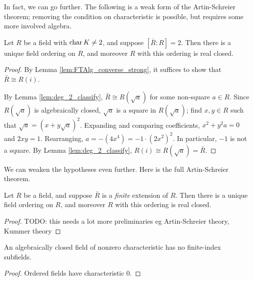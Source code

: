 In fact, we can go further. The following is a weak form of the Artin-Schreier theorem; removing the condition on characteristic is possible, but requires some more involved algebra.

\begin{theorem}
  \label{thm:Artin-Schreier_weak}
  Let $R$ be a field with $\operatorname{char} K\neq2$, and suppose $[\bar{R}:R]=2$. Then there is a unique field ordering on $R$, and moreover $R$ with this ordering is real closed.
\end{theorem}
\begin{proof}
  By Lemma \ref{lem:FTAlg_converse_strong}, it suffices to show that $\bar{R}\cong R(i)$.

  By Lemma \ref{lem:deg_2_classify}, $\bar{R}\cong R(\sqrt{a})$ for some non-square $a\in R$. Since $R(\sqrt{a})$ is algebraically closed, $\sqrt{a}$ is a square in $R(\sqrt{a})$; find $x,y\in R$ such that $\sqrt{a}=(x+y\sqrt{a})^2$. Expanding and comparing coefficients, $x^2+y^2a=0$ and $2xy=1$. Rearranging, $a=-(4x^4)=-1\cdot(2x^2)^2$. In particular, $-1$ is not a square. By Lemma \ref{lem:deg_2_classify}, $R(i)\cong R(\sqrt{a})=\bar{R}$.
\end{proof}

We can weaken the hypotheses even further. Here is the full Artin-Schreier theorem.

\begin{theorem}
  \label{thm:Artin-Schreier}
  Let $R$ be a field, and suppose $\bar{R}$ is a \textit{finite} extension of $R$. Then there is a unique field ordering on $R$, and moreover $R$ with this ordering is real closed.
\end{theorem}
\begin{proof}
  TODO: this needs a lot more preliminaries eg Artin-Schreier theory, Kummer theory
\end{proof}

\begin{corollary}
  \label{cor:ACF_char_p_no_fin_ind}
  An algebraically closed field of nonzero characteristic has no finite-index subfields.
\end{corollary}
\begin{proof}
  Ordered fields have characteristic 0.
\end{proof}

